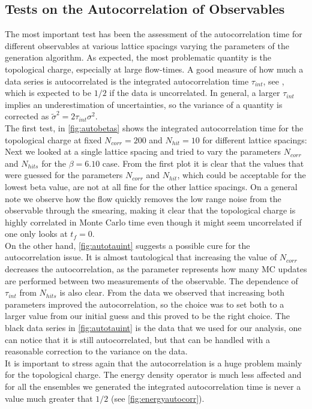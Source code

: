\subsection{Tests on the Autocorrelation of Observables}
\label{sec:obs_autocorr}
The most important test has been the assessment of the autocorrelation time for different observables at various lattice spacings varying the parameters of the generation algorithm. As expected, the most problematic quantity is the topological charge, especially at large flow-times. A good measure of how much a data series is autocorrelated is the integrated autocorrelation time $\tau_{int}$, see , which is expected to be $1/2$ if the data is uncorrelated. In general, a larger $\tau_{int}$ implies an underestimation of uncertainties, so the variance of a quantity is corrected as $\tilde\sigma^2 = 2\tau_{int}\sigma^2$. \\
The first test, in \cref{fig:autobetas} shows the integrated autocorrelation time for the topological charge at fixed $N_{corr}=200$ and $N_{hit} = 10$ for different lattice spacings:
Next we looked at a single lattice spacing and tried to vary the parameters $N_{corr}$ and $N_{hits}$ for the $\beta=6.10$ case. 
From the first plot it is clear that the values that were guessed for the parameters $N_{corr}$ and $N_{hit}$, which could be acceptable for the lowest beta value, are not at all fine for the other lattice spacings. On a general note we observe how the flow quickly removes the low range noise from the observable through the smearing, making it clear that the topological charge is highly correlated in Monte Carlo time even though it might seem uncorrelated if one only looks at $t_f = 0$. \\
On the other hand, \cref{fig:autotauint} suggests a possible cure for the autocorrelation issue. It is almost tautological that increasing the value of $N_{corr}$ decreases the autocorrelation, as the parameter represents how many MC updates are performed between two measurements of the observable. The dependence of $\tau_{int}$ from $N_{hits}$ is also clear. From the data we observed that increasing both parameters improved the autocorrelation, so the choice was to set both to a larger value from our initial guess and this proved to be the right choice. The black data series in  \cref{fig:autotauint} is the data that we used for our analysis, one can notice that it is still autocorrelated, but that can be handled with a reasonable correction to the variance on the data. \\
It is important to stress again that the autocorrelation is a huge problem mainly for the topological charge. The energy density operator is much less affected and for all the ensembles we generated the integrated autocorrelation time is never a value much greater that $1/2$ (see \cref{fig:energyautocorr}). 
 
